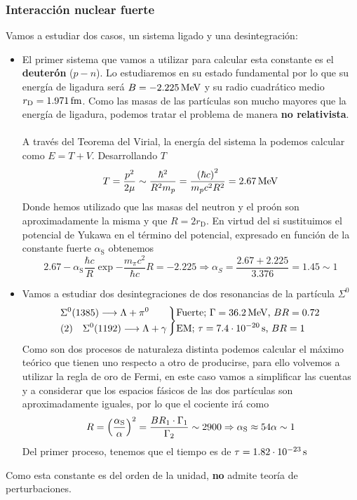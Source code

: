 \subsubsection{Interacción nuclear fuerte}
Vamos a estudiar dos casos, un sistema ligado y una desintegración:
\begin{itemize}
    \item El primer sistema que vamos a utilizar para calcular esta constante es el \textbf{deuterón} ($p-n$). Lo estudiaremos en su estado fundamental por lo que su energía de ligadura será $B=\unit[-2.225]{MeV}$ y su radio cuadrático medio $\unit[r_\mathrm{D}=1.971]{fm}$. Como las masas de las partículas son mucho mayores que la energía de ligadura, podemos tratar el problema de manera \textbf{no relativista}.\\\\
A través del Teorema del Virial, la energía del sistema la podemos calcular como $E=T+V$. Desarrollando $T$
\begin{equation*}
T=\frac{p^2}{2\mu} \sim \frac{\hbar^2}{R^2 m_p}=\frac{\qty(\hbar c)^2}{m_pc^2R^2}=\unit[2.67]{MeV}
\end{equation*}
Donde hemos utilizado que las masas del neutron y el proón son aproximadamente la misma y que $R=2r_\mathrm{D}$. En virtud del si sustituimos el potencial de Yukawa en el término del potencial, expresado en función de la constante fuerte $\alpha_\mathrm{S}$ obtenemos
\begin{equation*}
    2.67- \alpha_\mathrm{S} \frac{\hbar c}{R} \exp{-\frac{m_\pi c^2}{\hbar c}R}=-2.225 \Rightarrow \alpha_S=\frac{2.67+2.225}{3.376}=1.45 \sim 1
\end{equation*}
\item Vamos a estudiar dos desintegraciones de dos resonancias de la partícula $\Sigma^0$
\begin{equation*}
    \begin{aligned}
        &\Sigma^0(1385) \longrightarrow \Lambda+ \pi^0   \\
        & (2) \quad \Sigma^0(1192) \longrightarrow \Lambda+  \gamma
    \end{aligned}
    \left \} \begin{aligned}
        & \text{Fuerte; $\Gamma=\unit[36.2]{MeV}$, $BR=0.72$}\\
        &\text{EM;  $\tau=\unit[7.4\cdot 10^{-20}]{s}$, $BR=1$}
    \end{aligned} \right.
\end{equation*}
Como son dos procesos de naturaleza distinta podemos calcular el máximo teórico que tienen uno respecto a otro de producirse, para ello volvemos a utilizar la regla de oro de Fermi, en este caso vamos a simplificar las cuentas y a considerar que los espacios fásicos de las dos partículas son aproximadamente iguales, por lo que el cociente irá como $$R=\qty(\dfrac{\alpha_\mathrm{S}}{\alpha})^2=\dfrac{BR_1\cdot\Gamma_1}{\Gamma_2}\sim2900 \Rightarrow \alpha_\mathrm{S}\approx54\alpha \sim 1$$
Del primer proceso, tenemos que el tiempo es de $\tau=\unit[1.82\cdot 10^{-23}]{s}$
\end{itemize}
Como esta constante es del orden de la unidad, \textbf{no} admite teoría de perturbaciones.
